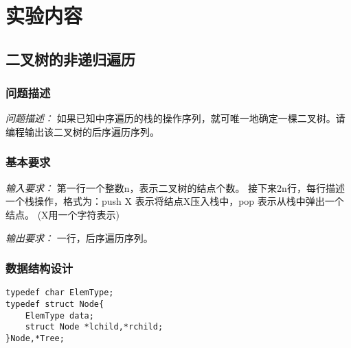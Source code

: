 \documentclass[a4paper,11pt]{article}%
\newenvironment{shadedquotation}
 {\begin{shaded*}
  \quoting[leftmargin=0pt, vskip=0pt]
 }
 {\endquoting
 \end{shaded*}
}
\begin{document}
\section{实验内容}
\subsection{二叉树的非递归遍历}
\subsubsection{问题描述}
\begin{shadedquotation}
    \emph{问题描述：}
    如果已知中序遍历的栈的操作序列，就可唯一地确定一棵二叉树。请编程输出该二叉树的后序遍历序列。
\end{shadedquotation}
\subsubsection{基本要求}
\begin{shadedquotation}
    \emph{输入要求：}
    第一行一个整数n，表示二叉树的结点个数。
接下来2n行，每行描述一个栈操作，格式为：push X 表示将结点X压入栈中，pop 表示从栈中弹出一个结点。
(X用一个字符表示)
\end{shadedquotation}
\begin{shadedquotation}
    \emph{输出要求：}
    一行，后序遍历序列。
\end{shadedquotation}
\subsubsection{数据结构设计}
\begin{lstlisting}[language={[ANSI]C},keywordstyle=\color{blue!70},commentstyle=\color{red!50!green!50!blue!50},frame=shadowbox,
				rulesepcolor=\color{red!20!green!20!blue!20}]
typedef char ElemType;
typedef struct Node{
    ElemType data;
    struct Node *lchild,*rchild;
}Node,*Tree;
\end{lstlisting}
\end{document}
